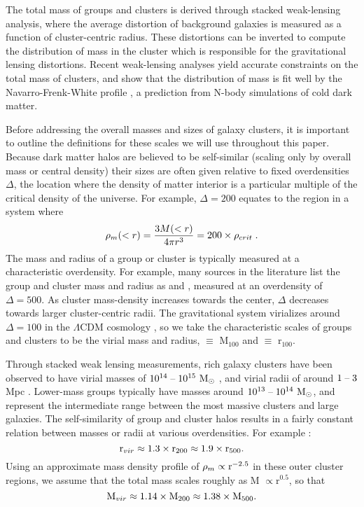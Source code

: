 The total mass of groups and clusters is derived through stacked
weak-lensing analysis, where the average distortion of background
galaxies is measured as a function of cluster-centric radius. These
distortions can be inverted to compute the distribution of mass in the
cluster which is responsible for the gravitational lensing
distortions. Recent weak-lensing analyses \citep{Mandelbaum2008,
  Sheldon2009a} yield accurate constraints on the total mass of
clusters, and show that the distribution of mass is fit well by the
Navarro-Frenk-White profile \citep[NFW,][]{Navarro1996}, a prediction
from N-body simulations of cold dark matter.

Before addressing the overall masses and sizes of galaxy clusters, it
is important to outline the definitions for these scales we will use
throughout this paper. Because dark matter halos are believed to be
self-similar (scaling only by overall mass or central density) their
sizes are often given relative to fixed overdensities $\Delta$, the
location where the density of matter interior is a particular multiple
of the critical density of the universe. For example, $\Delta = 200$
equates to the region in a system where
\begin{equation}
\rho_m(<r) = \frac{3M(<r)}{4\pi{}r^3} = 200\times\rho_{crit}\;. 
\end{equation}
The mass and radius of a group or cluster is typically measured at a
characteristic overdensity. For example, many sources in the
literature list the group and cluster mass and radius as \Mfive{} and
\rfive{}, measured at an overdensity of $\Delta = 500$. As cluster
mass-density increases towards the center, $\Delta$ decreases towards
larger cluster-centric radii. The gravitational system virializes
around $\Delta = 100$ in the $\Lambda{}$CDM cosmology \citep{Eke1996},
so we take the characteristic scales of groups and clusters to be the
virial mass and radius, \Mvir{} $ \equiv $ M$_{100}$ and
\rvir{} $ \equiv $ r$_{100}$.

Through stacked weak lensing measurements, rich galaxy clusters have
been observed to have virial masses of $10^{14}\;\textrm{--}\;10^{15}~\textrm{M}_\odot{}$
\citep{Mandelbaum2008}, and virial radii of around $1\;\textrm{--}\;3$ Mpc
\citep{Vikhlinin2006}. Lower-mass groups typically have masses
around $10^{13} \;\textrm{--}\; 10^{14}~\textrm{M}_\odot{}$, and represent the intermediate
range between the most massive clusters and large galaxies. The
self-similarity of group and cluster halos results in a fairly
constant relation between masses or radii at various overdensities. For
example \citep{Rasheed2011}:
\begin{equation}
\textrm{r\ensuremath{_{vir}}}{} \approx 1.3\times{}\textrm{r\ensuremath{_{200}}}{} \approx
1.9\times{}\textrm{r\ensuremath{_{500}}}{}.
\end{equation}
Using an approximate mass density profile of $\rho_m \propto
\textrm{r}^{-2.5}$ in these outer cluster regions, we assume that the
total mass scales roughly as M $\propto \textrm{r}^{0.5}$, so that
\begin{equation}
\textrm{M\ensuremath{_{vir}}}{} \approx 1.14\times{}\textrm{M\ensuremath{_{200}}}{} \approx 1.38 \times{}\textrm{M\ensuremath{_{500}}}{}.
\end{equation}

